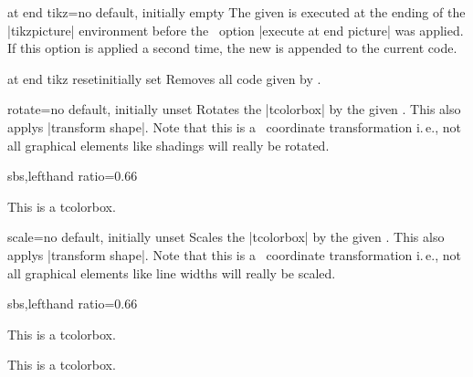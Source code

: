 \begin{docTcbKey}{at end tikz}{=}{no default, initially empty}
  The given  is executed at the ending of the |tikzpicture| environment
  before the \tikzname\  option |execute at end picture| was applied.
  If this option is applied a second time, the new  is appended to the current code.
\end{docTcbKey}


\begin{docTcbKey}{at end tikz reset}{}{initially set}
  Removes all code given by .
\end{docTcbKey}


\clearpage
\begin{docTcbKey}{rotate}{=}{no default, initially unset}
  Rotates the |tcolorbox| by the given .
  This also applys |transform shape|.
  Note that this is a \tikzname\  coordinate transformation i.\,e., not all graphical elements like shadings
  will really be rotated.
\begin{dispExample*}{sbs,lefthand ratio=0.66}

\begin{tcolorbox}[title=Rotated box,rotate=30]
This is a tcolorbox.
\end{tcolorbox}
\end{dispExample*}
\end{docTcbKey}

\begin{docTcbKey}{scale}{=}{no default, initially unset}
  Scales the |tcolorbox| by the given .
  This also applys |transform shape|.
  Note that this is a \tikzname\  coordinate transformation i.\,e., not all graphical elements like line widths
  will really be scaled.
\begin{dispExample*}{sbs,lefthand ratio=0.66}

\begin{tcolorbox}[title=Scaled box,scale=0.5]
This is a tcolorbox.
\end{tcolorbox}
\begin{tcolorbox}[title=Scaled box,scale=1.25]
This is a tcolorbox.
\end{tcolorbox}
\end{dispExample*}
\end{docTcbKey}


